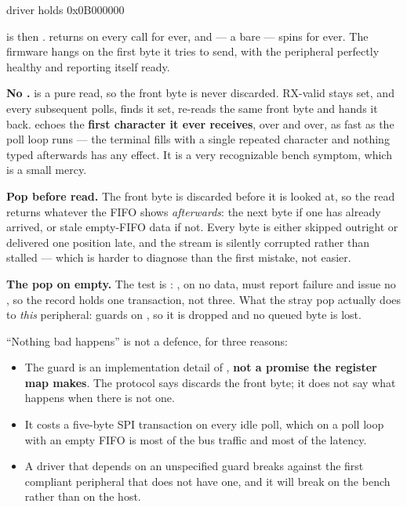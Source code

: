\begin{console}
driver holds 0x0B000000
\end{console}

\noindent{} is then .  returns
 on every call for ever, and  --- a bare
 --- spins for ever. The firmware hangs on the first byte it tries
to send, with the peripheral perfectly healthy and reporting itself ready. 

\textbf{No .}  is a pure read, so the front byte is never discarded.
RX-valid stays set, and every subsequent  polls, finds it set, re-reads the same front
byte and hands it back.  echoes the \textbf{first character it ever receives},
over and over, as fast as the poll loop runs --- the terminal fills with a single repeated character
and nothing typed afterwards has any effect. It is a very recognizable bench symptom, which is a
small mercy. 

\textbf{Pop before read.} The front byte is discarded before it is looked at, so the 
read returns whatever the FIFO shows \emph{afterwards}: the next byte if one has already arrived, or
stale empty-FIFO data if not. Every byte is either skipped outright or delivered one position late,
and the stream is silently corrupted rather than stalled --- which is harder to diagnose than the
first mistake, not easier. 

\textbf{The pop on empty.} The test is \textbf{}:
, on no data, must report failure and issue no , so the record holds one
transaction, not three. What the stray pop actually does to \emph{this} peripheral: 
guards  on , so it is dropped and no queued byte is lost.

``Nothing bad happens'' is not a defence, for three reasons:
\begin{itemize}
  \item The guard is an implementation detail of , \textbf{not a promise the register
    map makes}. The protocol says  discards the front byte; it does not say what
    happens when there is not one.
  \item It costs a five-byte SPI transaction on every idle poll, which on a poll loop with an empty
    FIFO is most of the bus traffic and most of the latency.
  \item A driver that depends on an unspecified guard breaks against the first compliant peripheral
    that does not have one, and it will break on the bench rather than on the host.
\end{itemize}

